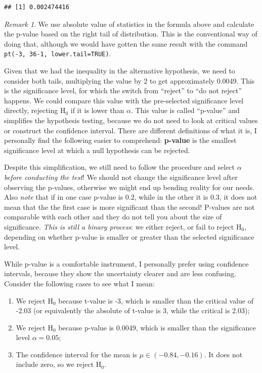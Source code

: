 \documentclass[
]{book}
\providecommand{\tightlist}{%
  \setlength{\itemsep}{0pt}\setlength{\parskip}{0pt}}
\theoremstyle{definition}
\theoremstyle{definition}
\theoremstyle{definition}
\theoremstyle{definition}
\theoremstyle{remark}
\newtheorem*{remark}{Remark}
\begin{document}
\begin{verbatim}
## [1] 0.002474416
\end{verbatim}

\begin{remark}
We use absolute value of statistics in the formula above and calculate the p-value based on the right tail of distribution. This is the conventional way of doing that, although we would have gotten the same result with the command \texttt{pt(-3,\ 36-1,\ lower.tail=TRUE)}.
\end{remark}

Given that we had the inequality in the alternative hypothesis, we need to consider both tails, multiplying the value by 2 to get approximately 0.0049. This is the significance level, for which the switch from ``reject'' to ``do not reject'' happens. We could compare this value with the pre-selected significance level directly, rejecting \(\mathrm{H}_0\) if it is lower than \(\alpha\). This value is called ``p-value'' and simplifies the hypothesis testing, because we do not need to look at critical values or construct the confidence interval. There are different definitions of what it is, I personally find the following easier to comprehend: \textbf{p-value} is the smallest significance level at which a null hypothesis can be rejected.

Despite this simplification, we still need to follow the procedure and select \(\alpha\) \emph{before conducting the test}! We should not change the significance level after observing the p-values, otherwise we might end up bending reality for our needs. Also \emph{note} that if in one case p-value is 0.2, while in the other it is 0.3, it does not mean that the the first case is more significant than the second! P-values are not comparable with each other and they do not tell you about the size of significance. \emph{This is still a binary process}: we either reject, or fail to reject \(\mathrm{H}_0\), depending on whether p-value is smaller or greater than the selected significance level.

While p-value is a comfortable instrument, I personally prefer using confidence intervals, because they show the uncertainty clearer and are less confusing. Consider the following cases to see what I mean:

\begin{enumerate}
\def\labelenumi{\arabic{enumi}.}
\tightlist
\item
  We reject \(\mathrm{H}_0\) because t-value is -3, which is smaller than the critical value of -2.03 (or equivalently the absolute of t-value is 3, while the critical is 2.03);
\item
  We reject \(\mathrm{H}_0\) because p-value is 0.0049, which is smaller than the significance level \(\alpha=0.05\);
\item
  The confidence interval for the mean is \(\mu \in (-0.84, -0.16)\). It does not include zero, so we reject \(\mathrm{H}_0\).
\end{enumerate}
\end{document}
